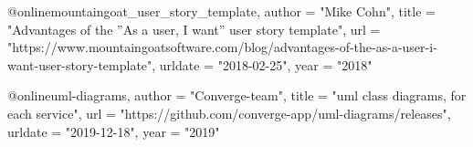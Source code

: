 
@online{mountaingoat_user_story_template,
    author = "Mike Cohn",
    title = "{Advantages of the ''As a user, I want'' user story template}",
    url = "https://www.mountaingoatsoftware.com/blog/advantages-of-the-as-a-user-i-want-user-story-template",
	urldate = "2018-02-25",
	year = "2018"
}

@online{uml-diagrams,
    author = "Converge-team",
    title = "{uml class diagrams, for each service}",
    url = "https://github.com/converge-app/uml-diagrams/releases",
	urldate = "2019-12-18",
    year = "2019"
}
